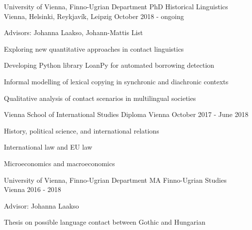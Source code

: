 

\begin{cventries}

  \cventry
    {University of Vienna, Finno-Ugrian Department} %
    {PhD Historical Linguistics} %
    {Vienna, Helsinki, Reykjavík, Leipzig} %
    {October 2018 - ongoing} %
    {
      \begin{cvitems} %
        \item {Advisors: Johanna Laakso, Johann-Mattis List}
        \item{Exploring new quantitative approaches in contact linguistics}
        \item{Developing Python library LoanPy for automated borrowing detection}
        \item{Informal modelling of lexical copying in synchronic and diachronic contexts}
        \item{Qualitative analysis of contact scenarios in multilingual societies}
      \end{cvitems}
    }

  \cventry
    {Vienna School of International Studies} %
    {Diploma} %
    {Vienna} %
    {October 2017 - June 2018} %
    {
    \begin{cvitems} %
        \item{History, political science, and international relations}
        \item{International law and EU law}
        \item{Microeconomics and macroeconomics}
      \end{cvitems}
    }
    
  \cventry
    {University of Vienna, Finno-Ugrian Department} %
    {MA Finno-Ugrian Studies} %
    {Vienna} %
    {2016 - 2018} %
    {
      \begin{cvitems} %
        \item {Advisor: Johanna Laakso}
        \item {Thesis on possible language contact between Gothic and Hungarian}
      \end{cvitems}
    }


\end{cventries}
